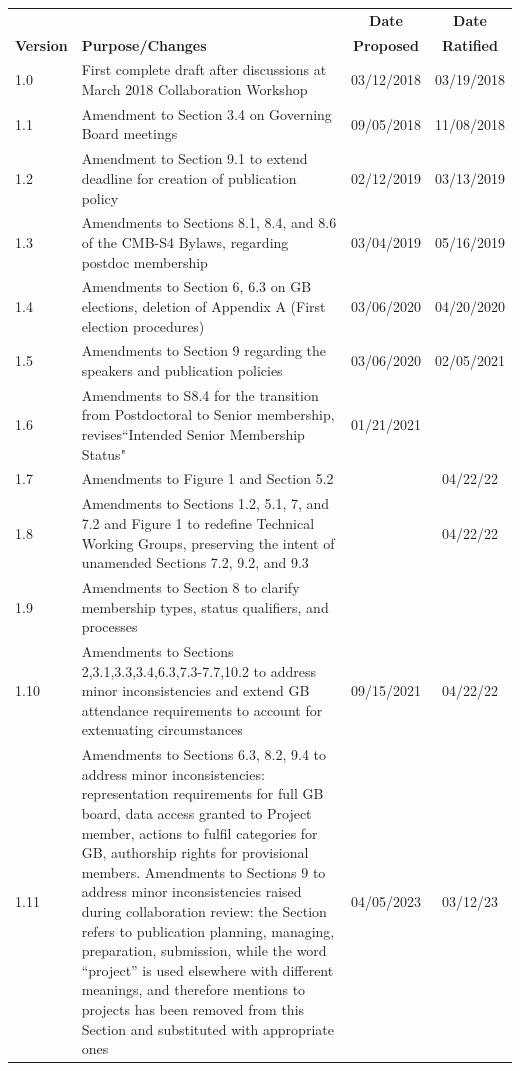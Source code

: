 \documentclass[12pt]{article}
\begin{document}
\begin{longtable}{| l | p{3.7in} | c | c |}
\hline
&  & {\bf Date} & {\bf Date}  \\
{\bf Version}  &  \hspace{1.0in} {\bf Purpose/Changes} & {\bf Proposed} & {\bf Ratified} \\
\hline\hline
1.0 & First complete draft after discussions at March 2018 Collaboration Workshop & 03/12/2018 & 03/19/2018 \\ \hline
1.1 & Amendment to Section 3.4 on Governing Board meetings & 09/05/2018 & 11/08/2018 \\ \hline
1.2 & Amendment to Section 9.1 to extend deadline for creation of publication policy & 02/12/2019 & 03/13/2019\\  \hline
1.3 & Amendments to Sections 8.1, 8.4, and 8.6 of the CMB-S4 Bylaws, regarding postdoc membership & 03/04/2019 & 05/16/2019 \\ \hline
1.4 & Amendments to Section 6, 6.3 on GB elections, deletion of Appendix A (First election procedures) & 03/06/2020 & 04/20/2020 \\ \hline
1.5 & Amendments to Section 9 regarding the speakers and publication policies & 03/06/2020 & 02/05/2021 \\ \hline
1.6 & Amendments to S8.4 for the transition from Postdoctoral to Senior membership, revises``Intended Senior Membership Status" & 01/21/2021 & \\ \hline
1.7 & Amendments to Figure 1 and Section 5.2 & & 04/22/22 \\ \hline
1.8 & Amendments to Sections 1.2, 5.1, 7, and 7.2 and Figure 1 to redefine Technical Working Groups, preserving the intent of unamended Sections 7.2, 9.2, and 9.3 &  & 04/22/22\\ \hline
1.9 & Amendments to Section 8 to clarify membership types, status qualifiers, and processes & & \\ \hline
1.10 & Amendments to Sections 2,3.1,3.3,3.4,6.3,7.3-7.7,10.2 to address minor inconsistencies and extend GB attendance requirements to account for extenuating circumstances & 09/15/2021 & 04/22/22 \\ \hline
1.11 & Amendments to Sections 6.3, 8.2, 9.4 to address minor inconsistencies: representation requirements for full GB board, data access granted to Project member, actions to fulfil categories for GB, authorship rights for provisional members. Amendments to Sections 9 to address minor inconsistencies raised during collaboration review: the Section refers to publication planning, managing, preparation, submission, while the word ``project'' is used elsewhere with different meanings, and therefore mentions to projects has been removed from this Section and substituted with appropriate ones & 04/05/2023 & 03/12/23 \\ \hline

\end{longtable}
\end{document}
